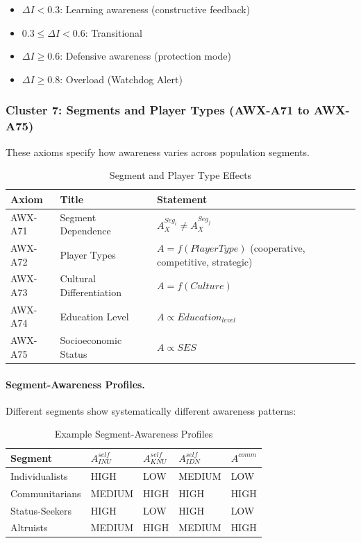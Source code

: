 \begin{itemize}
\item $\Delta I < 0.3$: Learning awareness (constructive feedback)
\item $0.3 \leq \Delta I < 0.6$: Transitional
\item $\Delta I \geq 0.6$: Defensive awareness (protection mode)
\item $\Delta I \geq 0.8$: Overload (Watchdog Alert)
\end{itemize}

\subsubsection{Cluster 7: Segments and Player Types (AWX-A71 to AWX-A75)}

These axioms specify how awareness varies across population segments.

\begin{table}[htbp]
\centering
\caption{Segment and Player Type Effects}
\label{tab:segment-effects}
\renewcommand{\arraystretch}{1.3}
\begin{tabular}{@{}llp{5.5cm}@{}}
\toprule
\textbf{Axiom} & \textbf{Title} & \textbf{Statement} \\
\midrule
AWX-A71 & Segment Dependence & $A_X^{Seg_i} \neq A_X^{Seg_j}$ \\
AWX-A72 & Player Types & $A = f(PlayerType)$ (cooperative, competitive, strategic) \\
AWX-A73 & Cultural Differentiation & $A = f(Culture)$ \\
AWX-A74 & Education Level & $A \propto Education_{level}$ \\
AWX-A75 & Socioeconomic Status & $A \propto SES$ \\
\bottomrule
\end{tabular}
\end{table}

\paragraph{Segment-Awareness Profiles.}
Different segments show systematically different awareness patterns:

\begin{table}[htbp]
\centering
\caption{Example Segment-Awareness Profiles}
\label{tab:segment-profiles}
\renewcommand{\arraystretch}{1.3}
\begin{tabular}{@{}lllll@{}}
\toprule
\textbf{Segment} & $A^{self}_{INU}$ & $A^{self}_{KNU}$ & $A^{self}_{IDN}$ & $A^{comm}$ \\
\midrule
Individualists & HIGH & LOW & MEDIUM & LOW \\
Communitarians & MEDIUM & HIGH & HIGH & HIGH \\
Status-Seekers & HIGH & LOW & HIGH & LOW \\
Altruists & MEDIUM & HIGH & MEDIUM & HIGH \\
\bottomrule
\end{tabular}
\end{table}

